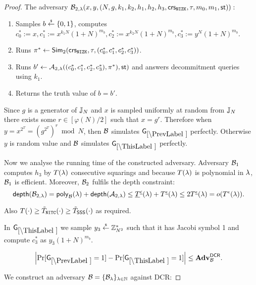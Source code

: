 \begin{proof}
The adversary $\mathcal{B}_{2,\lambda}(x,y,(N,g,k_1, k_2, h_1,h_2,h_3, \mathsf{crs}_{\mathtt{NIZK}}, \tau, m_0, m_1, \mathsf{st})):$
\vspace{-2mm}
\begin{enumerate}
\item Samples $b \stackrel{{\scriptscriptstyle\$}}{\leftarrow} \{0,1\}$, computes $c_0^*:=x, c_1^*:=x^{k_1N}(1+N)^{m_b}, c_2^*:=x^{k_2N}(1+N)^{m_b}, c_3^*:=y^{N}(1+N)^{m_b}$.
\item Runs $\pi^* \leftarrow \mathsf{Sim}_2(\mathsf{crs}_{\mathtt{NIZK}}, \tau, (c_0^*, c_1^*, c_2^*, c_3^*))$.
\item Runs $b' \leftarrow \mathcal{A}_{2, \lambda}((c_0^*, c_1^*, c_2^*, c_3^*), \pi^*), \mathsf{st})$ and answers decommitment queries using $k_1$.
\item Returns the truth value of $b=b'$.
\end{enumerate}
Since $g$ is a generator of $\mathbb{J}_N$ and $x$ is sampled uniformly at random from $\mathbb{J}_N$ there exists some $r \in [\varphi(N)/2]$ such that $x = g^{r}$. Therefore when $y = x^{2^T} = (g^{2^T})^{r} \bmod N$, then $\mathcal{B}$ simulates $\games_\prevgame$ perfectly. Otherwise $y$ is random value and $\mathcal{B}$ simulates $\games_\thisgame$ perfectly. 

Now we analyse the running time of the constructed adversary. Adversary $\mathcal{B}_1$ computes $h_3$ by $T(\lambda)$ consecutive squarings and because $T(\lambda)$ is polynomial in $\lambda$, $\mathcal{B}_1$ is efficient. Moreover, $\mathcal{B}_2$ fulfils the depth constraint:
\[ \mathsf{depth}(\mathcal{B}_{2,\lambda}) = \mathsf{poly}_{\mathcal{B}}(\lambda) + \mathsf{depth}(\mathcal{A}_{2,\lambda}) \leq \underline{T}^{\underline{\epsilon}}(\lambda) + T^{\underline{\epsilon}}(\lambda) \leq 2 T^{\underline{\epsilon}}(\lambda) = o(T^{\epsilon}(\lambda)). \] 

Also $T(\cdot) \geq \tilde{T}_{\mathtt{NITC}}(\cdot) \geq \tilde{T}_\mathsf{SSS}(\cdot)$ as required.

%




In $\games_\thisgame$ we sample $y_3 \stackrel{{\scriptscriptstyle\$}}{\leftarrow} \mathbb{Z}_{N^2}^*$ such that it has Jacobi symbol 1 and compute $c_3^*$ as $y_3(1+N)^{m_b}$. 

\begin{lemma}\label{lem:dcr}
\[
\left|\Pr[\games_\prevgame = 1] - \Pr[\games_\thisgame = 1]\right| \leq \advtg_\advB^\dcr.
\]
\end{lemma}
We construct an adversary $\mathcal{B} = \{\mathcal{B}_{\lambda}\}_{\lambda \in \mathbb{N}}$ against DCR:


\end{proof}
